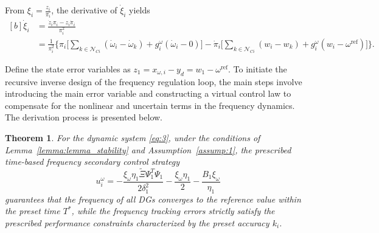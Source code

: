 \documentclass[]{interact}
\theoremstyle{plain}%
\newtheorem{theorem}{Theorem}
\theoremstyle{definition}
\theoremstyle{remark}
\begin{document}
From \( \xi_i = \frac{z_i}{\pi_i} \), the derivative of $\dot{\xi}_i$ yields 
\begin{equation}
\begin{aligned}[b]
\dot{\xi}_i &= \frac{\dot{z}_i \pi_i - z_i \dot{\pi}_i}{\pi_i^2} \\
&= \frac{1}{\pi_i^2} \bigg\{\pi_i  \bigg[ \sum_{k \in \mathcal{N}_{Ci}} (\dot{\omega}_i - \dot{\omega}_k) + g_i^\omega( \dot{\omega}_i-0) \bigg] - \dot{\pi}_i \bigg[ \sum_{k \in \mathcal{N}_{Ci}} (w_i - w_k) + g_i^\omega (w_i - \omega^{\text{ref}}) \bigg] \bigg\}.
\end{aligned}
\end{equation}
    
Define the state error variables as $z_1 = x_{\omega,i} - y_d = w_1 - \omega^{\text{ref}}$.
To initiate the recursive inverse design of the frequency regulation loop, the main steps involve introducing the main error variable and constructing a virtual control law to compensate for the nonlinear and uncertain terms in the frequency dynamics. The derivation process is presented below.

\begin{theorem}
For the dynamic system \eqref{eq:3}, under the conditions of Lemma~\ref{lemma:lemma_stability} and Assumption~\ref{assump:1}, the prescribed time-based frequency secondary control strategy
\[
u_i^\omega = -\frac{\xi_\omega \eta_1 \tilde{\Xi} \boldsymbol{\varPsi}_1^T \boldsymbol{\varPsi}_1}{2\delta_1^2} - \frac{\xi_\omega \eta_1}{2} - \frac{B_1 \xi_\omega}{\eta_1}
\]
guarantees that the frequency of all DGs converges to the reference value within the preset time $T^{*}$, while the frequency tracking errors strictly satisfy the prescribed performance constraints characterized by the preset accuracy $k_i$.
\end{theorem}
\end{document}
